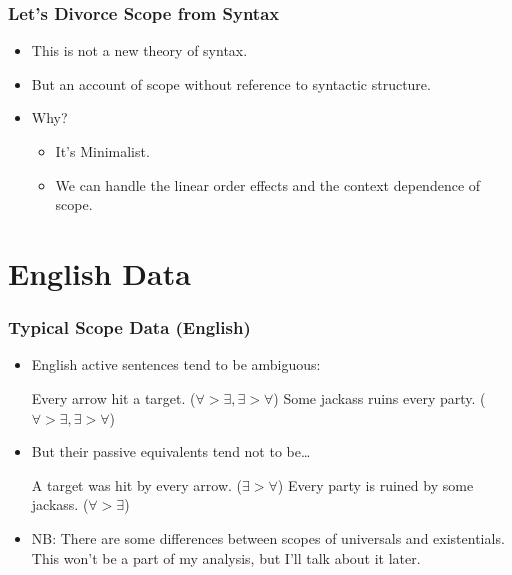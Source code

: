 \documentclass[aspectratio=169]{beamer}
\begin{document}
\begin{frame}
	\frametitle{Let's Divorce Scope from Syntax}\pause

	\begin{itemize}
		\item This is not a new theory of syntax.\pause
		\item But an account of scope without reference to syntactic structure.\pause
		\item Why?\pause
			\begin{itemize}
				\item It's Minimalist\texttrademark.\pause
				\item We can handle the linear order effects and the context dependence of scope.
			\end{itemize}
	\end{itemize}	

\end{frame}

\section{English Data}

\begin{frame}
	\frametitle{Typical Scope Data (English)}\pause

	\begin{itemize}
		\item English active sentences tend to be ambiguous:\pause
			\begin{exe}
				\ex \begin{xlist}
				\ex Every arrow hit a target. (${\forall}>{\exists},{\exists}>{\forall}$)\pause
				\ex Some jackass ruins every party. (${\forall}>{\exists},{\exists}>{\forall}$) \pause
				\end{xlist}
			\end{exe}

		\item But their passive equivalents tend not to be\ldots\pause
			\begin{exe}
				\ex  
				\begin{xlist}
				\ex A target was hit by every arrow. (${\exists}>{\forall}$)\pause
				\ex Every party is ruined by some jackass. (${\forall}>{\exists}$)\pause
				\end{xlist}
			\end{exe}
		\item NB: There are some differences between scopes of universals and existentials. This won't be a part of my analysis, but I'll talk about it later.
	\end{itemize}
\end{frame}
\end{document}

